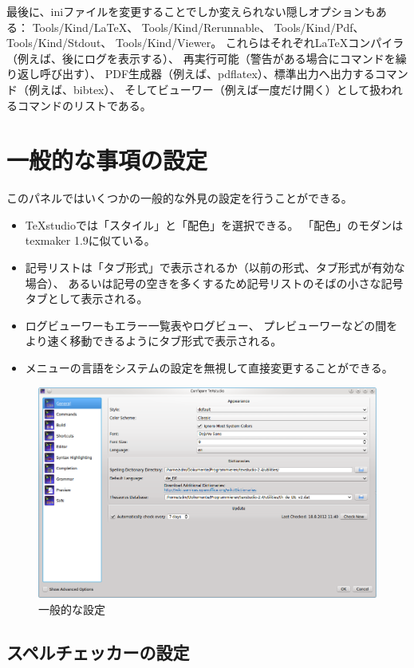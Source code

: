 最後に、iniファイルを変更することでしか変えられない隠しオプションもある：
Tools/Kind/LaTeX、 Tools/Kind/Rerunnable、 Tools/Kind/Pdf、
Tools/Kind/Stdout、 Tools/Kind/Viewer。
これらはそれぞれLaTeXコンパイラ（例えば、後にログを表示する）、
再実行可能（警告がある場合にコマンドを繰り返し呼び出す）、
PDF生成器（例えば、pdflatex）、標準出力へ出力するコマンド（例えば、bibtex）、
そしてビューワー（例えば一度だけ開く）として扱われるコマンドのリストである。

\section{一般的な事項の設定}

このパネルではいくつかの一般的な外見の設定を行うことができる。

\begin{itemize}
\item
  TeXstudioでは「スタイル」と「配色」を選択できる。
  「配色」のモダンはtexmaker 1.9に似ている。
\item
  記号リストは「タブ形式」で表示されるか（以前の形式、タブ形式が有効な場合）、
  あるいは記号の空きを多くするため記号リストのそばの小さな記号タブとして表示される。
\item
  ログビューワーもエラー一覧表やログビュー、
  プレビューワーなどの間をより速く移動できるようにタブ形式で表示される。
\item
  メニューの言語をシステムの設定を無視して直接変更することができる。
\end{itemize}

\begin{figure}[H]
  \centering
  \includegraphics[width=.8\linewidth]{configure_general.png}
  \caption{一般的な設定}
\end{figure}

\subsection{スペルチェッカーの設定}

